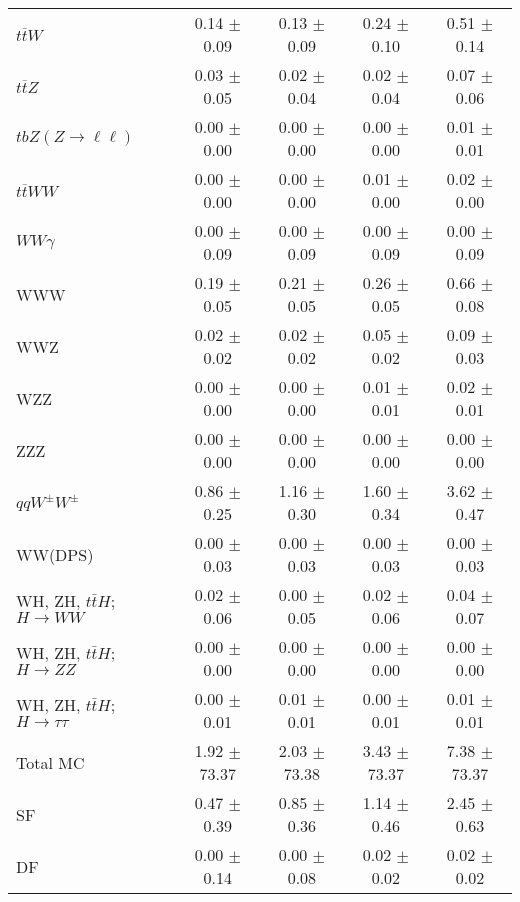 \begin{tabular}{l|cccc}
                   $t\overline{t}W$ &  0.14 $\pm$  0.09 &  0.13 $\pm$  0.09 &  0.24 $\pm$  0.10 &  0.51 $\pm$  0.14 \\
                   $t\overline{t}Z$ &  0.03 $\pm$  0.05 &  0.02 $\pm$  0.04 &  0.02 $\pm$  0.04 &  0.07 $\pm$  0.06 \\
    $tbZ (Z \rightarrow \ell \ell)$ &  0.00 $\pm$  0.00 &  0.00 $\pm$  0.00 &  0.00 $\pm$  0.00 &  0.01 $\pm$  0.01 \\
                  $t\overline{t}WW$ &  0.00 $\pm$  0.00 &  0.00 $\pm$  0.00 &  0.01 $\pm$  0.00 &  0.02 $\pm$  0.00 \\
                         $WW\gamma$ &  0.00 $\pm$  0.09 &  0.00 $\pm$  0.09 &  0.00 $\pm$  0.09 &  0.00 $\pm$  0.09 \\
                                WWW &  0.19 $\pm$  0.05 &  0.21 $\pm$  0.05 &  0.26 $\pm$  0.05 &  0.66 $\pm$  0.08 \\
                                WWZ &  0.02 $\pm$  0.02 &  0.02 $\pm$  0.02 &  0.05 $\pm$  0.02 &  0.09 $\pm$  0.03 \\
                                WZZ &  0.00 $\pm$  0.00 &  0.00 $\pm$  0.00 &  0.01 $\pm$  0.01 &  0.02 $\pm$  0.01 \\
                                ZZZ &  0.00 $\pm$  0.00 &  0.00 $\pm$  0.00 &  0.00 $\pm$  0.00 &  0.00 $\pm$  0.00 \\
                 $qqW^{\pm}W^{\pm}$ &  0.86 $\pm$  0.25 &  1.16 $\pm$  0.30 &  1.60 $\pm$  0.34 &  3.62 $\pm$  0.47 \\
                            WW(DPS) &  0.00 $\pm$  0.03 &  0.00 $\pm$  0.03 &  0.00 $\pm$  0.03 &  0.00 $\pm$  0.03 \\
WH, ZH, $t\bar{t}H$; $H \rightarrow WW$ &  0.02 $\pm$  0.06 &  0.00 $\pm$  0.05 &  0.02 $\pm$  0.06 &  0.04 $\pm$  0.07 \\
WH, ZH, $t\bar{t}H$; $H \rightarrow ZZ$ &  0.00 $\pm$  0.00 &  0.00 $\pm$  0.00 &  0.00 $\pm$  0.00 &  0.00 $\pm$  0.00 \\
WH, ZH, $t\bar{t}H$; $H \rightarrow \tau\tau$ &  0.00 $\pm$  0.01 &  0.01 $\pm$  0.01 &  0.00 $\pm$  0.01 &  0.01 $\pm$  0.01 \\
\hline\hline
                           Total MC &  1.92 $\pm$ 73.37 &  2.03 $\pm$ 73.38 &  3.43 $\pm$ 73.37 &  7.38 $\pm$ 73.37 \\
\hline
                                 SF &  0.47 $\pm$  0.39 &  0.85 $\pm$  0.36 &  1.14 $\pm$  0.46 &  2.45 $\pm$  0.63 \\
                                 DF &  0.00 $\pm$  0.14 &  0.00 $\pm$  0.08 &  0.02 $\pm$  0.02 &  0.02 $\pm$  0.02 \\

\end{tabular}

